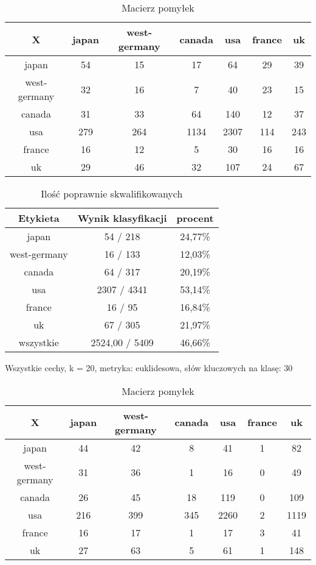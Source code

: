 \documentclass{classrep}
\begin{document}
\begin{table}[h]
\centering
\begin{tabular}{|c|c|c|c|c|c|c|}
\hline
 X  & japan & west-germany & canada & usa & france & uk\\
\hline
japan & 54 & 15 & 17 & 64 & 29 & 39\\
\hline
west-germany & 32 & 16 & 7 & 40 & 23 & 15\\
\hline
canada & 31 & 33 & 64 & 140 & 12 & 37\\
\hline
usa & 279 & 264 & 1134 & 2307 & 114 & 243\\
\hline
france & 16 & 12 & 5 & 30 & 16 & 16\\
\hline
uk & 29 & 46 & 32 & 107 & 24 & 67\\
\hline
\end{tabular}
\caption{Macierz pomyłek}\end{table}

\begin{table}[h]
\centering
\begin{tabular}{|c|c|c|}
\hline
Etykieta & Wynik klasyfikacji & procent\\
\hline
japan & 54 / 218 & 24,77\%\\
\hline
west-germany & 16 / 133 & 12,03\%\\
\hline
canada & 64 / 317 & 20,19\%\\
\hline
usa & 2307 / 4341 & 53,14\%\\
\hline
france & 16 / 95 & 16,84\%\\
\hline
uk & 67 / 305 & 21,97\%\\
\hline
wszystkie & 2524,00 / 5409 & 46,66\%\\
\hline
\end{tabular}
\caption{Ilość poprawnie skwalifikowanych}
\end{table}





\newpage
Wszystkie cechy, k = 20, metryka: euklidesowa, słów kluczowych na klasę: 30\newline

\begin{table}[h]
\centering
\begin{tabular}{|c|c|c|c|c|c|c|}
\hline
 X  & japan & west-germany & canada & usa & france & uk\\
\hline
japan & 44 & 42 & 8 & 41 & 1 & 82\\
\hline
west-germany & 31 & 36 & 1 & 16 & 0 & 49\\
\hline
canada & 26 & 45 & 18 & 119 & 0 & 109\\
\hline
usa & 216 & 399 & 345 & 2260 & 2 & 1119\\
\hline
france & 16 & 17 & 1 & 17 & 3 & 41\\
\hline
uk & 27 & 63 & 5 & 61 & 1 & 148\\
\hline
\end{tabular}
\caption{Macierz pomyłek}\end{table}
\end{document}
